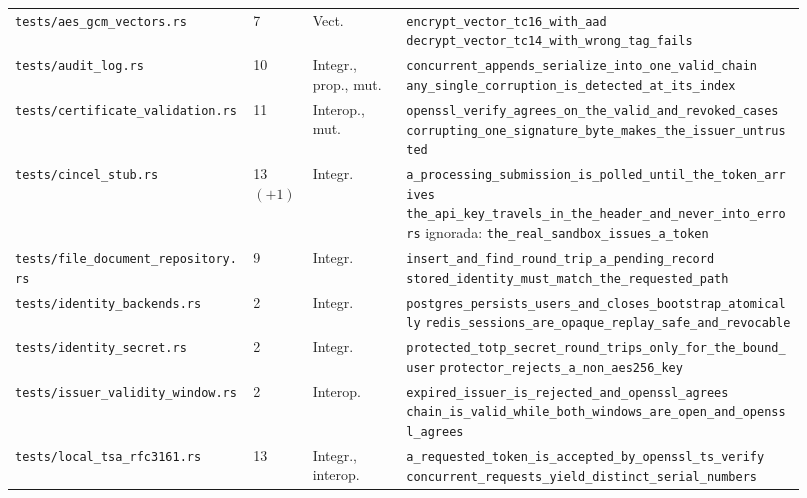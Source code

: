 \begin{longtable}{@{}L{0.285\linewidth}C{0.05\linewidth}L{0.115\linewidth}L{0.47\linewidth}@{}}
  \texttt{tests/aes\_gcm\_vectors.rs} & 7 & Vect. & \texttt{encrypt\_vector\_tc16\_with\_aad}\newline
    \texttt{decrypt\_vector\_tc14\_with\_wrong\_tag\_fails} \\
  \texttt{tests/audit\_log.rs} & 10 & Integr., prop., mut. & \texttt{concurrent\_appends\_serialize\_into\_one\_valid\_chain}\newline
    \texttt{any\_single\_corruption\_is\_detected\_at\_its\_index} \\
  \texttt{tests/certificate\_validation.rs} & 11 & Interop., mut. & \texttt{openssl\_verify\_agrees\_on\_the\_valid\_and\_revoked\_cases}\newline
    \texttt{corrupting\_one\_signature\_byte\_makes\_the\_issuer\_untrusted} \\
  \texttt{tests/cincel\_stub.rs} & 13 $(+1)$ & Integr. & \texttt{a\_processing\_submission\_is\_polled\_until\_the\_token\_arrives}\newline
    \texttt{the\_api\_key\_travels\_in\_the\_header\_and\_never\_into\_errors}\newline
    ignorada: \texttt{the\_real\_sandbox\_issues\_a\_token} \\
  \texttt{tests/file\_document\_repository.rs} & 9 & Integr. & \texttt{insert\_and\_find\_round\_trip\_a\_pending\_record}\newline
    \texttt{stored\_identity\_must\_match\_the\_requested\_path} \\
  \texttt{tests/identity\_backends.rs} & 2 & Integr. & \texttt{postgres\_persists\_users\_and\_closes\_bootstrap\_atomically}\newline
    \texttt{redis\_sessions\_are\_opaque\_replay\_safe\_and\_revocable} \\
  \texttt{tests/identity\_secret.rs} & 2 & Integr. & \texttt{protected\_totp\_secret\_round\_trips\_only\_for\_the\_bound\_user}\newline
    \texttt{protector\_rejects\_a\_non\_aes256\_key} \\
  \texttt{tests/issuer\_validity\_window.rs} & 2 & Interop. & \texttt{expired\_issuer\_is\_rejected\_and\_openssl\_agrees}\newline
    \texttt{chain\_is\_valid\_while\_both\_windows\_are\_open\_and\_openssl\_agrees} \\
  \texttt{tests/local\_tsa\_rfc3161.rs} & 13 & Integr., interop. & \texttt{a\_requested\_token\_is\_accepted\_by\_openssl\_ts\_verify}\newline
    \texttt{concurrent\_requests\_yield\_distinct\_serial\_numbers} \\

\end{longtable}
